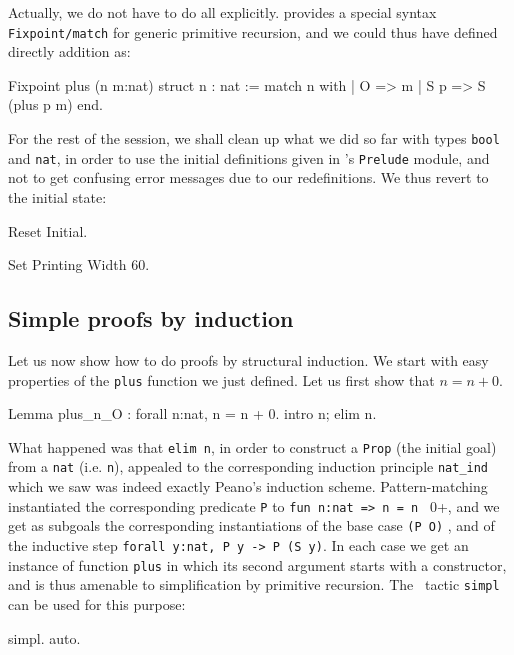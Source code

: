 \documentclass[11pt,a4paper]{book}
\begin{document}
Actually, we do not have to do all explicitly. {\Coq} provides a
special syntax {\tt Fixpoint/match} for generic primitive recursion,
and we could thus have defined directly addition as:

\begin{coq_example}
Fixpoint plus (n m:nat) {struct n} : nat :=
  match n with
  | O => m
  | S p => S (plus p m)
  end.
\end{coq_example}

For the rest of the session, we shall clean up what we did so far with 
types \verb:bool: and \verb:nat:, in order to use the initial definitions
given in \Coq's \verb:Prelude: module, and not to get confusing error
messages due to our redefinitions. We thus revert to the initial state:
\begin{coq_example}
Reset Initial.
\end{coq_example}
\begin{coq_eval}
Set Printing Width 60.
\end{coq_eval}

\subsection{Simple proofs by induction}

Let us now show how to do proofs by structural induction. We start with easy
properties of the \verb:plus: function we just defined. Let us first
show that $n=n+0$.
\begin{coq_example}
Lemma plus_n_O : forall n:nat, n = n + 0.
intro n; elim n.
\end{coq_example}

What happened was that \verb:elim n:, in order to construct a \verb:Prop:
(the initial goal) from a \verb:nat: (i.e. \verb:n:), appealed to the
corresponding induction principle \verb:nat_ind: which we saw was indeed
exactly Peano's induction scheme. Pattern-matching instantiated the 
corresponding predicate \verb:P: to \verb+fun n:nat => n = n + 0+, and we get
as subgoals the corresponding instantiations of the base case \verb:(P O): ,
and of the inductive step \verb+forall y:nat, P y -> P (S y)+.
In each case we get an instance of function \verb:plus: in which its second
argument starts with a constructor, and is thus amenable to simplification
by primitive recursion. The \Coq~tactic \verb:simpl: can be used for
this purpose:
\begin{coq_example}
simpl.
auto.
\end{coq_example}
\end{document}
